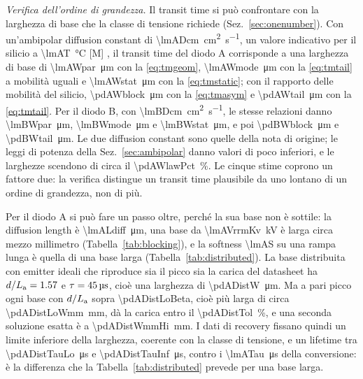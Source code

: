 \documentclass[10pt,a4paper]{scrartcl}
\let\newcommand\pdvaluedefine
\newcommand{\La}{L_\mathrm{a}}
\begin{document}
\emph{Verifica dell'ordine di grandezza.} Il transit time si può confrontare con la larghezza di base che la classe di tensione richiede (Sez.~\ref{sec:onenumber}). Con un'ambipolar diffusion constant di \SI{\lmADcm}{\centi\metre\squared\per\second}, un valore indicativo per il silicio a \SI{\lmAT}{\celsius} [M] \cite{lutz}, il transit time del diodo A corrisponde a una larghezza di base di \SI{\lmAWpar}{\micro\metre} con la \eqref{eq:tmgeom}, \SI{\lmAWmode}{\micro\metre} con la \eqref{eq:tmtail} a mobilità uguali e \SI{\lmAWstat}{\micro\metre} con la \eqref{eq:tmstatic}; con il rapporto delle mobilità del silicio, \SI{\pdAWblock}{\micro\metre} con la \eqref{eq:tmasym} e \SI{\pdAWtail}{\micro\metre} con la \eqref{eq:tmtail}. Per il diodo B, con \SI{\lmBDcm}{\centi\metre\squared\per\second}, le stesse relazioni danno \SI{\lmBWpar}{\micro\metre}, \SI{\lmBWmode}{\micro\metre} e \SI{\lmBWstat}{\micro\metre}, e poi \SI{\pdBWblock}{\micro\metre} e \SI{\pdBWtail}{\micro\metre}. Le due diffusion constant sono quelle della nota di origine; le leggi di potenza della Sez.~\ref{sec:ambipolar} danno valori di poco inferiori, e le larghezze scendono di circa il \SI{\pdAWlawPct}{\percent}. Le cinque stime coprono un fattore due: la verifica distingue un transit time plausibile da uno lontano di un ordine di grandezza, non di più.

Per il diodo A si può fare un passo oltre, perché la sua base non è sottile: la diffusion length è \SI{\lmALdiff}{\micro\metre}, una base da \SI{\lmAVrrmKv}{\kilo\volt} è larga circa mezzo millimetro (Tabella~\ref{tab:blocking}), e la softness \num{\lmAS} su una rampa lunga è quella di una base larga (Tabella~\ref{tab:distributed}). La base distribuita con emitter ideali che riproduce sia il picco sia la carica del datasheet ha $d/\La = \num{\pdADistBeta}$ e $\tau = \SI{45}{\micro\second}$, cioè una larghezza di \SI{\pdADistW}{\micro\metre}. Ma a pari picco ogni base con $d/\La$ sopra \num{\pdADistLoBeta}, cioè più larga di circa \SI{\pdADistLoWmm}{\milli\metre}, dà la carica entro il \SI{\pdADistTol}{\percent}, e una seconda soluzione esatta è a \SI{\pdADistWmmHi}{\milli\metre}. I dati di recovery fissano quindi un limite inferiore della larghezza, coerente con la classe di tensione, e un lifetime tra \SI{\pdADistTauLo}{\micro\second} e \SI{\pdADistTauInf}{\micro\second}, contro i \SI{\lmATau}{\micro\second} della conversione: è la differenza che la Tabella~\ref{tab:distributed} prevede per una base larga.
\end{document}
